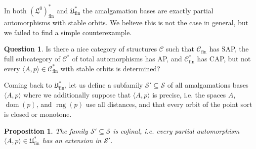 \documentclass[10pt,a4paper]{article}
\newtheorem{prop}[tw]{Proposition}
\theoremstyle{definition}
\newtheorem{question}[tw]{Question}
\theoremstyle{remark}
\newcommand \seq [1]{\langle #1 \rangle}
\newcommand \dom {\operatorname{dom}}
\newcommand \rng {\operatorname{rng}}
\newcommand \Su {\mathscr{S}}
\newcommand \C {\mathscr{C}}
\newcommand \fin {{\operatorname{fin}}}
\newcommand \Lin {\mathfrak{L}}
\newcommand \Ult {\mathfrak{U}}
\begin{document}
In both $(\Lin^0)^*_\fin$ and $\Ult^*_\fin$ the amalgamation bases are exactly partial automorphisms with stable orbits.
We believe this is not the case in general, but we failed to find a simple counterexample.
\begin{question} \label{que:stable_always_works}
    Is there a nice category of structures $\C$ such that $\C_\fin$ has SAP, the full subcategory of $\C^*$ of total automorphisms has AP, and $\C^*_\fin$ has CAP, but not every $\seq{A, p} \in \C^*_\fin$ with stable orbits is determined?
\end{question}

Coming back to $\Ult^*_\fin$,
let us define a subfamily $\Su' \subseteq \Su$ of all amalgamations bases $\seq{A, p}$ where we additionally suppose that $\seq{A, p}$ is precise, i.e. the spaces $A$, $\dom(p)$, and $\rng(p)$ use all distances, and that every orbit of the point sort is closed or monotone.


\begin{prop} \label{thm:sufficient_cofinal}
    The family $\Su' \subseteq \Su$ is cofinal, i.e. every partial automorphism $\seq{A, p} \in \Ult^*_\fin$ has an extension in $\Su'$.
\end{prop}
\end{document}
